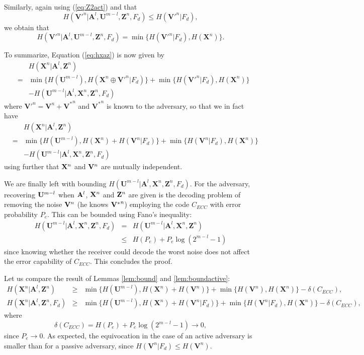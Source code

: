 \documentclass{article}[11pt]
\newcommand{\am}{\mathbf{A}}
\newcommand{\um}{\mathbf{U}}
\newcommand{\vm}{\mathbf{V}}
\newcommand{\xm}{\mathbf{X}}
\newcommand{\zm}{\mathbf{Z}}
\newenvironment{proof}{\noindent {\bf Proof. \ }}{\hfill \vrule height 2pt depth 4pt width 6pt\par\noindent}
\begin{document}
\begin{proof}
Similarly, again using (\ref{eq:Z2act}) and that
\[
H({\vm'}^n|\am^l,\um^{m-l},\zm^n, F_d)\leq H({\vm'}^n|F_d),
\]
we obtain that
\[
H({\vm'}^n|\am^l,\um^{m-l},\zm^n, F_d) =\min \{H({\vm'}^n|F_d), H(\xm^n) \}.
\]

To summarize, Equation (\ref{eq:hxaz}) is now given by
\begin{eqnarray*}
&&H(\xm^n|\am^l,\zm^n)\\
&=&\min \{H(\um^{m-l}), H(\xm^n\oplus{\vm'}^n|F_d) \}+
    \min \{H({\vm'}^n|F_d), H(\xm^n) \}\\
&&-H(\um^{m-l}|\am^l,\xm^n,\zm^n,F_d)
\end{eqnarray*}
where ${\vm'}^n=\vm^n+{\vm^*}^n$ and ${\vm^*}^n$ is known to the adversary, so
that we in fact have
\begin{eqnarray*}
&&H(\xm^n|\am^l,\zm^n)\\
&=& \min \{H(\um^{m-l}), H(\xm^n)+ H(\vm^n|F_d)\}+
\min \{H(\vm^n|F_d), H(\xm^n) \}\\
&&-H(\um^{m-l}|\am^l,\xm^n,\zm^n,F_d)
\end{eqnarray*}
using further that ${\bf X}^n$ and ${\bf V}^n$ are mutually independent.

We are finally left with bounding $H(\um^{m-l}|\am^l,\xm^n,\zm^n,
F_d)$. For the adversary, recovering ${\bf U}^{m-l}$ when ${\bf A}^l$, ${\bf X}^n$ and
${\bf Z}^n$ are given is the decoding problem of removing the noise
${\bf V}^n$ (he knows ${{\bf V}^*}^n$) employing the code $C_{ECC}$ with error probability
$P_e$. This can be bounded using Fano's inequality:
\begin{eqnarray*}
H(\um^{m-l}|\am^l,\xm^n,\zm^n, F_d)
&=& H(\um^{m-l}|\am^l,\xm^n,\zm^n)\\
&\leq &  H(P_e) + P_e \log(2^{m-l}-1)
\end{eqnarray*}
since knowing whether the receiver could decode the worst noise does not affect the error
capability of $C_{ECC}$.
This concludes the proof.
\end{proof}

Let us compare the result of Lemmas \ref{lem:bound} and \ref{lem:boundactive}:
\begin{eqnarray*}
H(\xm^n|\am^l,\zm^n)&\geq & \min\{H(\um^{m-l}), H(\xm^n)+H(\vm^n)\}+ \min\{H(\vm^n),H(\xm^n) \}- \delta(C_{ECC}),\\
H(\xm^n|\am^l,\zm^n, F_d) &\geq & \min \{H(\um^{m-l}), H(\xm^n)+ H(\vm^n|F_d)\}+\min \{H(\vm^n|F_d), H(\xm^n) \}-\delta(C_{ECC}),
\end{eqnarray*}
where
\[
\delta(C_{ECC})  =  H(P_e)+P_e \log(2^{m-l}-1)\rightarrow 0,
\]
since $P_e\rightarrow 0$. As expected, the equivocation in the
case of an active adversary is smaller than for a passive
adversary, since $H(\vm^n|F_d)\leq H(\vm^n)$.
\end{document}
